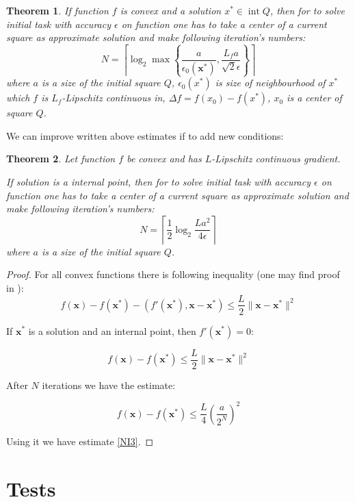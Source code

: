 \documentclass[12pt]{article}
\newtheorem{theorem}{Theorem}[section]
\DeclareMathOperator{\intt}{int}
\begin{document}
\begin{theorem}
If function $f$ is convex and a solution $x^*\in \intt Q$, then for to solve initial task with accuracy $\epsilon$ on function one has to take a center of a current square as approximate  solution and make following iteration's numbers:
\begin{equation}\label{NI2}
N = \left\lceil\log_2\max\left\{\frac{a}{\epsilon_0(\textbf{x}^*)},\frac{L_fa}{\sqrt{2}\epsilon}\right\}\right\rceil
\end{equation}
where $a$ is a size of the initial square $Q$, $\epsilon_0(x^*)$ is size of neighbourhood of $x^*$ which $f$ is $L_f$-Lipschitz continuous in, $\Delta f =  f(x_0) - f(x^*)$, $x_0$ is a center of square $Q$.
\end{theorem}

We can improve written above estimates if to add new conditions:

\begin{theorem}
Let function $f$ be convex and has $L$-Lipschitz continuous gradient.

If solution is a internal point, then for to solve initial task with accuracy $\epsilon$ on function one has to take a center of a current square as approximate  solution and make following iteration's numbers:
\begin{equation}\label{NI3}N = \left\lceil\frac{1}{2}\log_2\frac{La^2}{4\epsilon}\right\rceil\end{equation}
where $a$ is a size of the initial square $Q$.
\end{theorem}

\begin{proof}
For all convex functions there is following inequality (one may find proof in \cite{Nesterov}):
$$f(\textbf{x}) - f(\textbf{x}^*) - (f'(\textbf{x}^*), \textbf{x} - \textbf{x}^*) \leq \frac{L}{2}\|\textbf{x}-\textbf{x}^*\|^2$$

If $\textbf{x}^*$ is a solution and an internal point, then $f'(\textbf{x}^*) = 0$:

$$f(\textbf{x}) - f(\textbf{x}^*)\leq \frac{L}{2}\|\textbf{x}-\textbf{x}^*\|^2$$

After $N$ iterations we have the estimate:

$$f(\textbf{x}) - f(\textbf{x}^*)\leq \frac{L}{4}\left(\frac{a}{2^N}\right)^2$$

Using it we have estimate \eqref{NI3}.
\end{proof}

\section{Tests}
\end{document}

